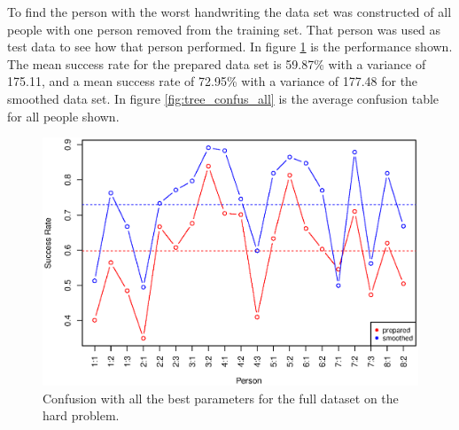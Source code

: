 To find the person with the worst handwriting the data set was constructed of all people with one person removed from the training set.
That person was used as test data to see how that person performed.
In figure \ref{fig:tree_performance_all} is the performance shown.
The mean success rate for the prepared data set is 59.87\% with a variance of 175.11, 
and a mean success rate of 72.95\% with a variance of 177.48 for the smoothed data set.
In figure \ref{fig:tree_confus_all} is the average confusion table for all people shown.

\begin{figure}[H]
\centering
\includegraphics[width=\textwidth]{graphics/tree_performance_all_combined}
\caption{Confusion with all the best parameters for the full dataset on the hard problem.}
\label{fig:tree_performance_all}
\end{figure}

